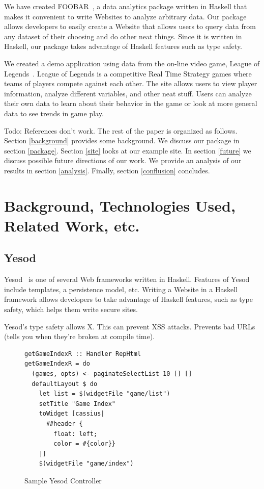 \documentclass{chi2009}
\begin{document}
We have created FOOBAR~\cite{foobar}, a data analytics package written in Haskell that makes it convenient to write Websites to analyze arbitrary data. Our package allows developers to easily create a Website that allows users to query data from any dataset of their choosing and do other neat things. Since it is written in Haskell, our package takes advantage of Haskell features such as type safety. 

We created  a demo application using data from the on-line video game, League of Legends~\cite{lol}. League of Legends is a competitive Real Time Strategy games where teams of players compete against each other. The site allows users to view player information, analyze different variables, and other neat stuff. Users can analyze their own data to learn about their behavior in the game or look at more general data to see trends in game play. 

Todo: References don't work.
The rest of the paper is organized as follows. Section \ref{background} provides some background. We discuss our package in section \ref{package}. Section \ref{site} looks at our example site. In section \ref{future} we discuss possible future directions of our work. We provide an analysis of our results in section \ref{analysis}. Finally, section \ref{conflusion} concludes.

\section{Background, Technologies Used, Related Work, etc.}
\label{sec:background}

\subsection{Yesod}

Yesod~\cite{yesod} is one of several Web frameworks written in Haskell. Features of Yesod include templates, a persistence model, etc. Writing a Website in a Haskell framework allows developers to take advantage of Haskell features, such as type safety, which helps them write secure sites.

Yesod's type safety allows X. This can prevent XSS attacks. Prevents bad URLs (tells you when they're broken at compile time).

\begin{figure}[]
\begin{verbatim}
getGameIndexR :: Handler RepHtml
getGameIndexR = do
  (games, opts) <- paginateSelectList 10 [] []
  defaultLayout $ do
    let list = $(widgetFile "game/list")
    setTitle "Game Index"
    toWidget [cassius|
      ##header {
        float: left;
        color = #{color}}
    |] 
    $(widgetFile "game/index")
\end{verbatim}
    \caption{Sample Yesod Controller}
    \label{controller}
\end{figure}
\end{document}
